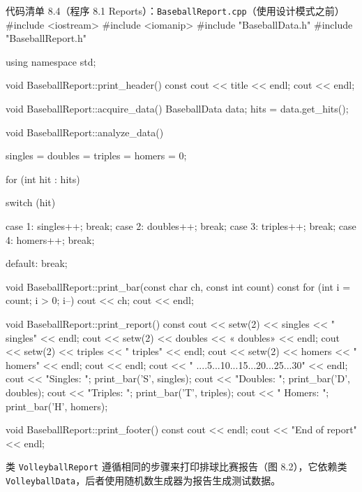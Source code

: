 \begin{codeboxt}{代码清单 8.4（程序 8.1 Reports）：\texttt{Baseball\allowbreak{}Report.\allowbreak{}cpp}（使用设计模式之前）}
#include <iostream>
#include <iomanip>
#include "BaseballData.h"
#include "BaseballReport.h"

using namespace std;

void BaseballReport::print_header() const
{
    cout << title << endl;
    cout << endl;
}

void BaseballReport::acquire_data()
{
    BaseballData data;
    hits = data.get_hits();
}

void BaseballReport::analyze_data()
{
    singles = doubles = triples = homers = 0;

    for (int hit : hits)
    {
        switch (hit)
        {
            case 1: singles++; break;
            case 2: doubles++; break;
            case 3: triples++; break;
            case 4: homers++;  break;

            default: break;
        }
    }
}

void BaseballReport::print_bar(const char ch, const int count) const
{
    for (int i = count; i > 0; i--) cout << ch;
    cout << endl;
}

void BaseballReport::print_report() const
{
    cout << setw(2) << singles << " singles" << endl;
    cout << setw(2) << doubles << « doubles» << endl;
    cout << setw(2) << triples << " triples" << endl;
    cout << setw(2) << homers  << " homers"  << endl;
    cout << endl;
    cout << "         ....5...10...15...20...25...30" << endl;
    cout << "Singles: "; print_bar('S', singles);
    cout << "Doubles: "; print_bar('D', doubles);
    cout << "Triples: "; print_bar('T', triples);
    cout << " Homers: "; print_bar('H', homers);
}

void BaseballReport::print_footer() const
{
    cout << endl;
    cout << "End of report" << endl;
}
\end{codeboxt}

类 \texttt{Volleyball\allowbreak{}Report} 遵循相同的步骤来打印排球比赛报告（图 8.2），它依赖类 \texttt{Volleyball\allowbreak{}Data}，后者使用随机数生成器为报告生成测试数据。


